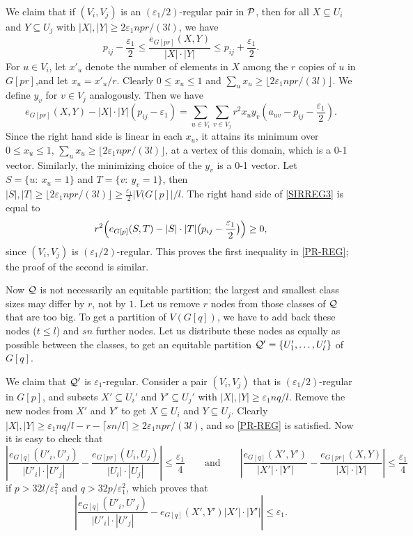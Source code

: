 \documentclass[12pt]{article}
\numberwithin{equation}{section}
\def\eps{\varepsilon}
\def\PP{{\cal P}}\def\QQ{{\cal Q}}\def\RR{{\cal R}}
\begin{document}
We claim that if $(V_i,V_j)$ is an $(\eps_1/2)$-regular pair in
$\PP$, then for all $X\subseteq U_i$ and $Y\subseteq U_j$ with
$|X|,|Y|\ge 2\eps_1npr/(3l)$, we have
\begin{equation}\label{PR-REG}
p_{ij}-\frac{\eps_1}2\le \frac{e_{G[pr]}(X,Y)}{|X|\cdot|Y|}\le
p_{ij}+\frac{\eps_1}2.
\end{equation}
For $u\in V_i$, let $x'_u$ denote the number of elements in $X$
among the $r$ copies of $u$ in $G[pr]$,and let $x_u=x'_u/r$. Clearly
$0\le x_u\le 1$ and $\sum_u x_u \ge \lfloor 2\eps_1npr/(3l)\rfloor$.
We define $y_v$ for $v\in V_j$ analogously. Then we have
\begin{equation}\label{SIRREG3}
e_{G[pr]}(X,Y)-|X|\cdot|Y|(p_{ij}-\eps_1) = \sum_{u\in
V_i}\sum_{v\in V_j}r^2 x_uy_v (a_{uv}- p_{ij}-\frac{\eps_1}2).
\end{equation}
Since the right hand side is linear in each $x_u$, it attains its
minimum over $0\le x_u\le 1$, $\sum_u x_u \ge \lfloor
2\eps_1npr/(3l)\rfloor$, at a vertex of this domain, which is a 0-1
vector. Similarly, the minimizing choice of the $y_v$ is a 0-1
vector. Let $S=\{u:~x_u=1\}$ and $T=\{v:~y_v=1\}$, then $|S|,|T|\ge
\lfloor 2\eps_1npr/(3l)\rfloor \ge \frac{\eps_1}2|V(G[p]|/l$. The
right hand side of \eqref{SIRREG3} is equal to
\[
r^2\Bigl(e_{G[p]}(S,T)-|S|\cdot|T|\bigl(p_{ij}
-\frac{\eps_1}2\bigr)\Bigr)\ge0,
\]
since $(V_i,V_j)$ is $(\eps_1/2)$-regular. This proves the first
inequality in \eqref{PR-REG}; the proof of the second is similar.

Now $\QQ$ is not necessarily an equitable partition; the largest and
smallest class sizes may differ by $r$, not by $1$. Let us remove
$r$ nodes from those classes of $\QQ$ that are too big. To get a
partition of $V(G[q])$, we have to add back these nodes ($t\le l$)
and $sn$ further nodes. Let us distribute these nodes as equally as
possible between the classes, to get an equitable partition
$\QQ'=\{U_1',\dots,U_l'\}$ of $G[q]$.

We claim that $\QQ'$ is $\eps_1$-regular. Consider a pair
$(V_i,V_j)$ that is $(\eps_1/2)$-regular in $G[p]$, and subsets
$X'\subseteq U_i'$ and $Y'\subseteq U_j'$ with
$|X|,|Y|\ge\eps_1nq/l$. Remove the new nodes from $X'$ and $Y'$ to
get $X\subseteq U_i$ and $Y\subseteq U_j$. Clearly $|X|,|Y|\ge
\eps_1nq/l - r- \lceil sn/l\rceil\ge 2\eps_1npr/(3l)$, and so
\eqref{PR-REG} is satisfied. Now it is easy to check that
\[
\left|\frac{e_{G[q]}(U'_i,U'_j)}{|U'_i|\cdot|U'_j|}
-\frac{e_{G[pr]}(U_i,U_j)}{|U_i|\cdot|U_j|}\right| \le
\frac{\eps_1}4
\qquad\text{and}\qquad
\left|\frac{e_{G[q]}(X',Y')}{|X'|\cdot|Y'|}
-\frac{e_{G[pr]}(X,Y)}{|X|\cdot|Y|}\right| \le \frac{\eps_1}4
\]
if $p>32 l/\eps_1^2$ and $q>32 p/\eps_1^2$, which proves that
\[
\left|\frac{e_{G[q]}(U'_i,U'_j)}{|U'_i|\cdot|U'_j|}
-e_{G[q]}(X',Y'){|X'|\cdot|Y'|}\right| \le \eps_1.
\]
\end{document}
